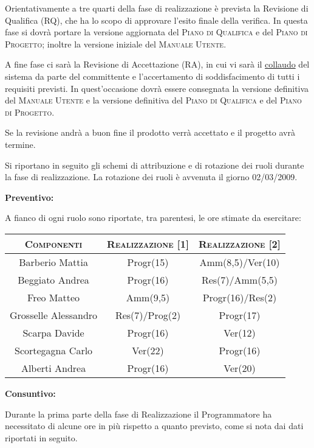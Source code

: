 \documentclass[11pt,a4paper]{article}
\begin{document}
Orientativamente a tre quarti della fase di realizzazione è prevista la Revisione di Qualifica (RQ), che ha lo scopo di approvare l'esito finale della verifica. In questa fase si dovrà portare la versione aggiornata del \textsc{Piano di Qualifica} e del \textsc{Piano di Progetto}; inoltre la versione iniziale del \textsc{Manuale Utente}.

A fine fase ci sarà la Revisione di Accettazione (RA), in cui vi sarà il \underline{collaudo} del sistema da parte del committente e l'accertamento di soddisfacimento di tutti i requisiti previsti. In quest'occasione dovrà essere consegnata la versione definitiva del \textsc{Manuale Utente} e la versione definitiva del \textsc{Piano di Qualifica} e del \textsc{Piano di Progetto}.

Se la revisione andrà a buon fine il prodotto verrà accettato e il progetto avrà termine.

Si riportano in seguito gli schemi di attribuzione e di rotazione dei ruoli durante la fase di realizzazione. La rotazione dei ruoli è avvenuta il giorno 02/03/2009.

\bigskip \bigskip 
\begin{large}\textbf{Preventivo:}\end{large}
\newline
A fianco di ogni ruolo sono riportate, tra parentesi, le ore stimate da esercitare:
\\
\begin{center}
\begin{tabular}{|c||c|c|}
\hline
\textsc{Componenti} & \textsc{Realizzazione [1]} & \textsc{Realizzazione [2]} \\ \hline \hline
Barberio Mattia & Progr(15) & Amm(8,5)/Ver(10) \\ \hline
Beggiato Andrea & Progr(16) & Res(7)/Amm(5,5) \\ \hline
Freo Matteo & Amm(9,5) & Progr(16)/Res(2) \\ \hline
Grosselle Alessandro & Res(7)/Prog(2) & Progr(17) \\ \hline
Scarpa Davide & Progr(16) & Ver(12) \\ \hline
Scortegagna Carlo & Ver(22) & Progr(16) \\ \hline
Alberti Andrea & Progr(16) & Ver(20) \\ \hline
\end{tabular}
\end{center}

\bigskip \bigskip 
\begin{large}\textbf{Consuntivo:}\end{large}
\newline
Durante la prima parte della fase di Realizzazione il Programmatore ha necessitato di alcune ore in più rispetto a quanto previsto, come si nota dai dati riportati in seguito.
\end{document}
